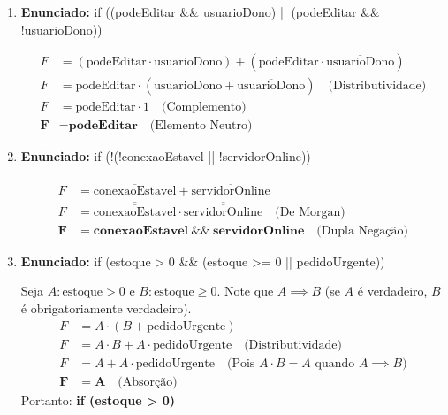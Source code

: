 \documentclass[12pt]{article}
\begin{document}
\begin{enumerate}[label=\textbf{\arabic*.}]
\item \textbf{Enunciado:} if ((podeEditar \&\& usuarioDono) || (podeEditar \&\& !usuarioDono))
\begin{solucao}
\begin{align*}
    F &= (\text{podeEditar} \cdot \text{usuarioDono}) + (\text{podeEditar} \cdot \overline{\text{usuarioDono}}) \\
    F &= \text{podeEditar} \cdot (\text{usuarioDono} + \overline{\text{usuarioDono}}) \quad \text{(Distributividade)} \\
    F &= \text{podeEditar} \cdot 1 \quad \text{(Complemento)} \\
    \mathbf{F} &= \mathbf{\text{podeEditar}} \quad \text{(Elemento Neutro)}
\end{align*}
\end{solucao}

\item \textbf{Enunciado:} if (!(!conexaoEstavel || !servidorOnline))
\begin{solucao}
\begin{align*}
    F &= \overline{\overline{\text{conexaoEstavel}} + \overline{\text{servidorOnline}}} \\
    F &= \overline{\overline{\text{conexaoEstavel}}} \cdot \overline{\overline{\text{servidorOnline}}} \quad \text{(De Morgan)} \\
    \mathbf{F} &= \mathbf{\text{conexaoEstavel} \ \&\& \ \text{servidorOnline}} \quad \text{(Dupla Negação)}
\end{align*}
\end{solucao}

\item \textbf{Enunciado:} if (estoque > 0 \&\& (estoque >= 0 || pedidoUrgente))
\begin{solucao}
Seja $A: \text{estoque} > 0$ e $B: \text{estoque} \geq 0$. Note que $A \implies B$ (se $A$ é verdadeiro, $B$ é obrigatoriamente verdadeiro).
\begin{align*}
    F &= A \cdot (B + \text{pedidoUrgente}) \\
    F &= A \cdot B + A \cdot \text{pedidoUrgente} \quad \text{(Distributividade)} \\
    F &= A + A \cdot \text{pedidoUrgente} \quad \text{(Pois } A \cdot B = A \text{ quando } A \implies B) \\
    \mathbf{F} &= \mathbf{A} \quad \text{(Absorção)}
\end{align*}
Portanto: \textbf{if (estoque > 0)}
\end{solucao}


\end{enumerate}
\end{document}
